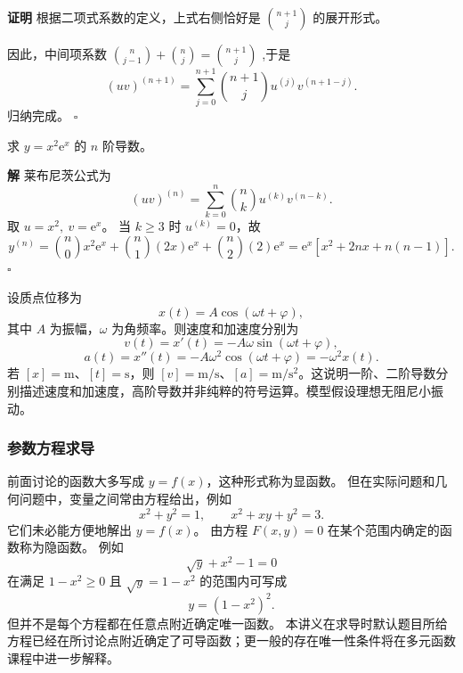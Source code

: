 \documentclass[fontset=fandol]{ctexart}
\newenvironment{extra}{\begin{mdframed}[style=extrastyle, frametitle={* 选读内容（不要求掌握）}]}{\end{mdframed}}
\newenvironment{proofdetail}{\par\noindent\textbf{证明}\quad}{\hfill$\square$\par\vspace{0.8em}}
\newenvironment{solution}{\par\noindent\textbf{解}\quad}{\hfill$\square$\par\vspace{0.8em}}
\newcommand{\ee}{\mathrm{e}}
\begin{document}
\begin{extra}
\begin{proofdetail}
根据二项式系数的定义，上式右侧恰好是 $\binom{n+1}{j}$ 的展开形式。

因此，中间项系数 $\binom{n}{j-1} + \binom{n}{j} = \binom{n+1}{j}$ ,于是
\[
(uv)^{(n+1)}=\sum_{j=0}^{n+1}\binom{n+1}{j}u^{(j)}v^{(n+1-j)}.
\]
归纳完成。
\end{proofdetail}

\begin{example}
	求 $y=x^2\ee^x$ 的 $n$ 阶导数。
\end{example}
\begin{solution}
	莱布尼茨公式为
	\[
	(uv)^{(n)}=\sum_{k=0}^n\binom nk u^{(k)}v^{(n-k)}.
	\]
	取 $u=x^2,\ v=\ee^x$。 当 $k\geq3$ 时 $u^{(k)}=0$，故
	\[
	y^{(n)}=\binom n0x^2\ee^x+\binom n1(2x)\ee^x+\binom n2(2)\ee^x
	=\ee^x\left[x^2+2nx+n(n-1)\right].
	\]
\end{solution}
\end{extra}
\begin{application}[物理：简谐运动与高阶导数]
设质点位移为
\[
x(t)=A\cos(\omega t+\varphi),
\]
其中 $A$ 为振幅，$\omega$ 为角频率。则速度和加速度分别为
\[
v(t)=x'(t)=-A\omega\sin(\omega t+\varphi),
\]
\[
a(t)=x''(t)=-A\omega^2\cos(\omega t+\varphi)
=-\omega^2x(t).
\]
若 $[x]=\mathrm m$、$[t]=\mathrm s$，则 $[v]=\mathrm{m/s}$、$[a]=\mathrm{m/s^2}$。这说明一阶、二阶导数分别描述速度和加速度，高阶导数并非纯粹的符号运算。模型假设理想无阻尼小振动。
\end{application}



\subsubsection*{参数方程求导}


\iffalse
前面讨论的函数大多写成 $y=f(x)$，这种形式称为显函数。 但在实际问题和几何问题中，变量之间常由方程给出，例如
\[
x^2+y^2=1,\qquad x^2+xy+y^2=3.
\]
它们未必能方便地解出 $y=f(x)$。 由方程 $F(x,y)=0$ 在某个范围内确定的函数称为隐函数。 例如
\[
\sqrt{y}+x^2-1=0
\]
在满足 $1-x^2\geq0$ 且 $\sqrt{y}=1-x^2$ 的范围内可写成
\[
y=(1-x^2)^2.
\]
但并不是每个方程都在任意点附近确定唯一函数。 本讲义在求导时默认题目所给方程已经在所讨论点附近确定了可导函数；更一般的存在唯一性条件将在多元函数课程中进一步解释。

\begin{center}
\end{center}
\end{document}
